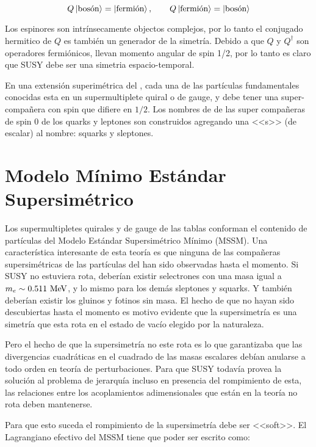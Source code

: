 \begin{equation}
  Q \left| \text{bosón} \right> = \left| \text{fermión} \right>, \quad \quad Q \left| \text{fermión} \right> = \left| \text{bosón} \right>
\end{equation}

Los espinores son intrínsecamente objectos complejos, por lo tanto el conjugado
hermitico de $Q$ es también un generador de la simetría. Debido a que $Q$ y $Q^\dagger$
son operadores fermiónicos, llevan momento angular de spin 1/2, por lo tanto es
claro que SUSY debe ser una simetria espacio-temporal.

En una extensión superimétrica del {\SM}, cada una de las partículas fundamentales
conocidas esta en un supermultiplete quiral o de gauge, y debe tener una super-compa\~nera
con spin que difiere en $1/2$.
Los nombres de de las super compa\~neras de spin 0 de los quarks y leptones son construidos agregando
una <<s>> (de escalar) al nombre: squarks y sleptones.


\section{Modelo Mínimo Estándar Supersimétrico}

Los supermultipletes quirales y de gauge de las tablas conforman el contenido
de partículas del Modelo Estándar Supersimétrico Mínimo (MSSM). Una característica
interesante de esta teoría es que ninguna de las compa\~neras supersimétricas
de las partículas del {\SM} han sido observadas hasta el momento.
Si SUSY no estuviera rota, deberían existir selectrones con una masa igual
a $m_e \sim 0.511 \mev$, y lo mismo para los demás sleptones y squarks. Y también
deberían existir los gluinos y fotinos sin masa.
El hecho de que no hayan sido descubiertas hasta el momento es motivo evidente
que la supersimetría es una simetría que esta rota en el estado de vacío elegido
por la naturaleza.

Pero el hecho de que la supersimetría no este rota es lo que garantizaba
que las divergencias cuadráticas en el cuadrado de las masas escalares
debían anularse a todo orden en teoría de perturbaciones.
Para que SUSY todavía provea la solución al problema de jerarquía incluso
en presencia del rompimiento de esta, las relaciones entre los acoplamientos
adimensionales que están en la teoría no rota deben mantenerse.

Para que esto suceda el rompimiento de la supersimetría debe ser <<soft>>.
El Lagrangiano efectivo del MSSM tiene que poder ser escrito como:


